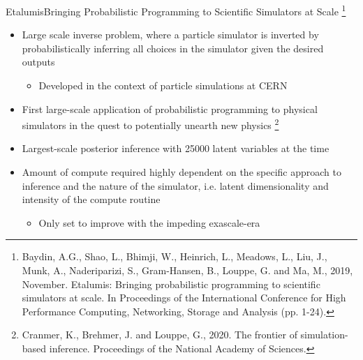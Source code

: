 \documentclass[AERbeamer%
              ,optEnglish%
              ,optBiber%
              ,optBibstyleAlphabetic%
              ,optBeamerClassicFormat%
              ]{AERlatex}%
\begin{document}
\begin{frame}[c]{Etalumis}{Bringing Probabilistic Programming to Scientific Simulators at Scale \footnote{Baydin, A.G., Shao, L., Bhimji, W., Heinrich, L., Meadows, L., Liu, J., Munk, A., Naderiparizi, S.,
                                                                                                          Gram-Hansen, B., Louppe, G. and Ma, M., 2019, November. Etalumis: Bringing probabilistic programming
                                                                                                          to scientific simulators at scale. In Proceedings of the International Conference for High Performance
                                                                                                          Computing, Networking, Storage and Analysis (pp. 1-24).}}
    \centering
    \begin{itemize}
        \item Large scale inverse problem, where a particle simulator is inverted by probabilistically inferring
              all choices in the simulator given the desired outputs
        \begin{itemize}
            \item Developed in the context of particle simulations at CERN
        \end{itemize}
        \item First large-scale application of probabilistic programming to physical simulators in the quest
              to potentially unearth new physics \footnote{Cranmer, K., Brehmer, J. and Louppe, G., 2020. The frontier of simulation-based inference. Proceedings of the National Academy of Sciences.}
        \item Largest-scale posterior inference with 25000 latent variables at the time
        \item Amount of compute required highly dependent on the specific approach to inference and the nature of the
              simulator, i.e. latent dimensionality and intensity of the compute routine
        \begin{itemize}
            \item Only set to improve with the impeding exascale-era
        \end{itemize}
    \end{itemize}
\end{frame}
\end{document}
